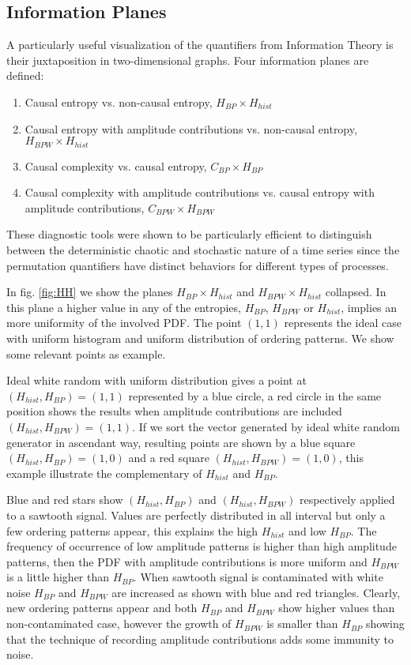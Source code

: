\subsection{Information Planes}

A particularly useful visualization of the quantifiers from Information Theory is their juxtaposition in two-dimensional graphs.
Four information planes are defined:
\begin{enumerate}
	\item Causal entropy vs. non-causal entropy, $H_{BP} \times H_{hist}$
	\item Causal entropy with amplitude contributions vs. non-causal entropy, $H_{BPW} \times H_{hist}$
	\item Causal complexity vs. causal entropy, $C_{BP} \times H_{BP}$
	\item Causal complexity with amplitude contributions vs. causal entropy with amplitude contributions, $C_{BPW} \times H_{BPW}$
\end{enumerate}

These diagnostic tools were shown to be particularly efficient to distinguish between the deterministic chaotic and stochastic nature of a time series since the permutation quantifiers have distinct behaviors for different types of processes.

In fig. \ref{fig:HH} we show the planes $H_{BP} \times H_{hist}$ and $H_{BPW} \times H_{hist}$ collapsed.
In this plane a higher value in any of the entropies, $H_{BP}$, $H_{BPW}$ or $H_{hist}$, implies an more uniformity of the involved PDF.
The point $(1,1)$ represents the ideal case with uniform histogram and uniform distribution of ordering patterns.
We show some relevant points as example.

Ideal white random with uniform distribution gives a point at $(H_{hist}, H_{BP})=(1, 1)$ represented by a blue circle, a red circle in the same position shows the results when amplitude contributions are included $(H_{hist}, H_{BPW})=(1, 1)$.
If we sort the vector generated by ideal white random generator in ascendant way, resulting points are shown by a blue square $(H_{hist}, H_{BP})=(1, 0)$ and a red square $(H_{hist}, H_{BPW})=(1, 0)$, this example illustrate the complementary of $H_{hist}$ and $H_{BP}$.

Blue and red stars show $(H_{hist}, H_{BP})$ and $(H_{hist}, H_{BPW})$ respectively applied to a sawtooth signal.
Values are perfectly distributed in all interval but only a few ordering patterns appear, this explains the high $H_{hist}$ and low $H_{BP}$.
The frequency of occurrence of low amplitude patterns is higher than high amplitude patterns, then the PDF with amplitude contributions is more uniform and $H_{BPW}$ is a little higher than $H_{BP}$.
When sawtooth signal is contaminated with white noise $H_{BP}$ and $H_{BPW}$ are increased as shown with blue and red triangles.
Clearly, new ordering patterns appear and both $H_{BP}$ and $H_{BPW}$ show higher values than non-contaminated case, however the growth of $H_{BPW}$ is smaller than $H_{BP}$ showing that the technique of recording amplitude contributions adds some immunity to noise.

